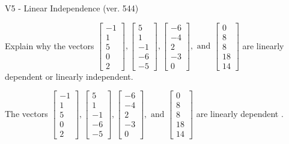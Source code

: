 \begin{exercise}
  \begin{exerciseTitle}V5 - Linear Independence (ver. 544)\end{exerciseTitle}
  \begin{exerciseStatement}
    Explain why the vectors \(\left[\begin{array}{r}
-1 \\
1 \\
5 \\
0 \\
2
\end{array}\right] , \left[\begin{array}{r}
5 \\
1 \\
-1 \\
-6 \\
-5
\end{array}\right] , \left[\begin{array}{r}
-6 \\
-4 \\
2 \\
-3 \\
0
\end{array}\right] , \text{ and } \left[\begin{array}{r}
0 \\
8 \\
8 \\
18 \\
14
\end{array}\right]\) are linearly dependent or linearly independent.	


  \end{exerciseStatement}
  \begin{exerciseAnswer}
   The vectors \(\left[\begin{array}{r}
-1 \\
1 \\
5 \\
0 \\
2
\end{array}\right] , \left[\begin{array}{r}
5 \\
1 \\
-1 \\
-6 \\
-5
\end{array}\right] , \left[\begin{array}{r}
-6 \\
-4 \\
2 \\
-3 \\
0
\end{array}\right] , \text{ and } \left[\begin{array}{r}
0 \\
8 \\
8 \\
18 \\
14
\end{array}\right]\) are 
  	 linearly dependent  .
  


  \end{exerciseAnswer}
\end{exercise}